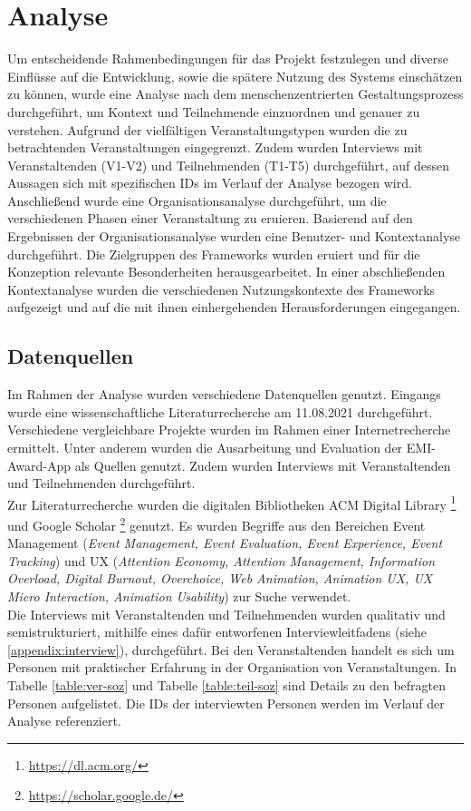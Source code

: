 \chapter{Analyse} \label{chapter:analysis}

Um entscheidende Rahmenbedingungen für das Projekt festzulegen und diverse
Einflüsse auf die Entwicklung, sowie die spätere Nutzung des Systems einschätzen
zu können, wurde eine Analyse nach dem menschenzentrierten Gestaltungsprozess
durchgeführt, um Kontext und Teilnehmende einzuordnen und genauer zu verstehen.
Aufgrund der vielfältigen Veranstaltungstypen wurden die zu betrachtenden
Veranstaltungen eingegrenzt. Zudem wurden Interviews mit Veranstaltenden (V1-V2)
und Teilnehmenden  (T1-T5) durchgeführt, auf dessen Aussagen sich mit
spezifischen IDs im Verlauf der Analyse bezogen wird. Anschließend wurde eine
Organisationsanalyse durchgeführt, um die verschiedenen Phasen einer
Veranstaltung zu eruieren. Basierend auf den Ergebnissen der
Organisationsanalyse wurden eine Benutzer- und Kontextanalyse durchgeführt. Die
Zielgruppen des Frameworks wurden eruiert und für die Konzeption relevante
Besonderheiten herausgearbeitet. In einer abschließenden Kontextanalyse wurden
die verschiedenen Nutzungskontexte des Frameworks aufgezeigt und auf die mit
ihnen einhergehenden Herausforderungen eingegangen.


\section{Datenquellen}

Im Rahmen der Analyse wurden verschiedene Datenquellen genutzt. Eingangs wurde
eine wissenschaftliche Literaturrecherche am 11.08.2021 durchgeführt.
Verschiedene vergleichbare Projekte wurden im Rahmen einer Internetrecherche
ermittelt. Unter anderem wurden die Ausarbeitung und Evaluation der
EMI-Award-App als Quellen genutzt. Zudem wurden Interviews mit Veranstaltenden
und Teilnehmenden durchgeführt. \\
Zur Literaturrecherche wurden die digitalen Bibliotheken ACM Digital Library
\footnote{\url{https://dl.acm.org/}} und Google Scholar
\footnote{\url{https://scholar.google.de/}} genutzt. Es wurden Begriffe aus den
Bereichen Event Management (\emph{Event Management, Event Evaluation, Event
Experience, Event Tracking}) und UX (\emph{Attention Economy, Attention
Management, Information Overload, Digital Burnout, Overchoice, Web Animation,
Animation UX, UX Micro Interaction, Animation Usability}) zur Suche verwendet.
\\
Die Interviews mit Veranstaltenden und Teilnehmenden wurden qualitativ und
semistrukturiert, mithilfe eines dafür entworfenen Interviewleitfadens (siehe
\autoref{appendix:interview}), durchgeführt. Bei den Veranstaltenden handelt es sich um Personen mit
praktischer Erfahrung in der Organisation von Veranstaltungen. In Tabelle
\ref{table:ver-soz} und Tabelle \ref{table:teil-soz} sind Details zu den
befragten Personen aufgelistet. Die IDs der interviewten Personen werden im
Verlauf der Analyse referenziert.

